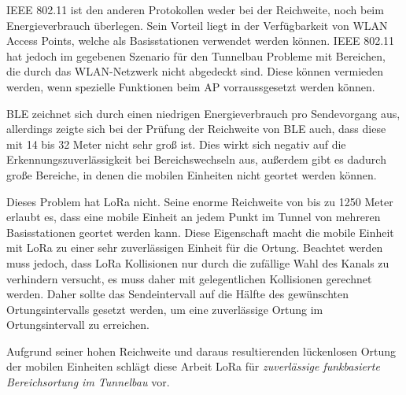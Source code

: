 IEEE 802.11 ist den anderen Protokollen weder bei der Reichweite, noch beim Energieverbrauch überlegen. 
Sein Vorteil liegt in der Verfügbarkeit von WLAN Access Points, welche als Basisstationen verwendet werden können.
IEEE 802.11 hat jedoch im gegebenen Szenario für den Tunnelbau Probleme mit Bereichen, die durch das WLAN-Netzwerk nicht abgedeckt sind. 
Diese können vermieden werden, wenn spezielle Funktionen beim AP vorraussgesetzt werden können.

BLE zeichnet sich durch einen niedrigen Energieverbrauch pro Sendevorgang aus, allerdings zeigte sich bei der Prüfung der Reichweite von BLE auch, dass diese mit 14 bis 32 Meter nicht sehr groß ist.
Dies wirkt sich negativ auf die Erkennungszuverlässigkeit bei Bereichswechseln aus, außerdem gibt es dadurch große Bereiche, in denen die mobilen Einheiten nicht geortet werden können.

Dieses Problem hat LoRa nicht. 
Seine enorme Reichweite von bis zu 1250 Meter erlaubt es, dass eine mobile Einheit an jedem Punkt im Tunnel von mehreren Basisstationen geortet werden kann.
Diese Eigenschaft macht die mobile Einheit mit LoRa zu einer sehr zuverlässigen Einheit für die Ortung.
Beachtet werden muss jedoch, dass LoRa Kollisionen nur durch die zufällige Wahl des Kanals zu verhindern versucht, es muss daher mit gelegentlichen Kollisionen gerechnet werden.
Daher sollte das Sendeintervall auf die Hälfte des gewünschten Ortungsintervalls gesetzt werden, um eine zuverlässige Ortung im Ortungsintervall zu erreichen.

Aufgrund seiner hohen Reichweite und daraus resultierenden lückenlosen Ortung der mobilen Einheiten schlägt diese Arbeit LoRa für \emph{zuverlässige funkbasierte Bereichsortung im Tunnelbau} vor.






